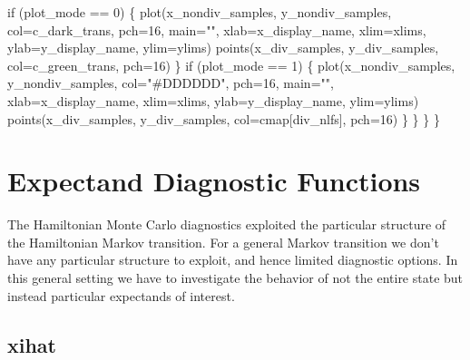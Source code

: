 \documentclass[
  letterpaper,
  DIV=11,
  numbers=noendperiod]{scrartcl}
\newenvironment{Shaded}{\begin{snugshade}}{\end{snugshade}}
\newcommand{\AttributeTok}[1]{\textcolor[rgb]{0.40,0.45,0.13}{#1}}
\newcommand{\ControlFlowTok}[1]{\textcolor[rgb]{0.00,0.23,0.31}{#1}}
\newcommand{\DecValTok}[1]{\textcolor[rgb]{0.68,0.00,0.00}{#1}}
\newcommand{\FunctionTok}[1]{\textcolor[rgb]{0.28,0.35,0.67}{#1}}
\newcommand{\NormalTok}[1]{\textcolor[rgb]{0.00,0.23,0.31}{#1}}
\newcommand{\SpecialCharTok}[1]{\textcolor[rgb]{0.37,0.37,0.37}{#1}}
\newcommand{\StringTok}[1]{\textcolor[rgb]{0.13,0.47,0.30}{#1}}
\begin{document}
\begin{Shaded}
\begin{Highlighting}[]
      \ControlFlowTok{if}\NormalTok{ (plot\_mode }\SpecialCharTok{==} \DecValTok{0}\NormalTok{) \{}
        \FunctionTok{plot}\NormalTok{(x\_nondiv\_samples, y\_nondiv\_samples,}
             \AttributeTok{col=}\NormalTok{c\_dark\_trans, }\AttributeTok{pch=}\DecValTok{16}\NormalTok{, }\AttributeTok{main=}\StringTok{""}\NormalTok{,}
             \AttributeTok{xlab=}\NormalTok{x\_display\_name, }\AttributeTok{xlim=}\NormalTok{xlims, }
             \AttributeTok{ylab=}\NormalTok{y\_display\_name, }\AttributeTok{ylim=}\NormalTok{ylims)}
        \FunctionTok{points}\NormalTok{(x\_div\_samples, y\_div\_samples,}
               \AttributeTok{col=}\NormalTok{c\_green\_trans, }\AttributeTok{pch=}\DecValTok{16}\NormalTok{)}
\NormalTok{      \}}
      \ControlFlowTok{if}\NormalTok{ (plot\_mode }\SpecialCharTok{==} \DecValTok{1}\NormalTok{) \{}
        \FunctionTok{plot}\NormalTok{(x\_nondiv\_samples, y\_nondiv\_samples,}
             \AttributeTok{col=}\StringTok{"\#DDDDDD"}\NormalTok{, }\AttributeTok{pch=}\DecValTok{16}\NormalTok{, }\AttributeTok{main=}\StringTok{""}\NormalTok{,}
             \AttributeTok{xlab=}\NormalTok{x\_display\_name, }\AttributeTok{xlim=}\NormalTok{xlims, }
             \AttributeTok{ylab=}\NormalTok{y\_display\_name, }\AttributeTok{ylim=}\NormalTok{ylims)}
        \FunctionTok{points}\NormalTok{(x\_div\_samples, y\_div\_samples,}
               \AttributeTok{col=}\NormalTok{cmap[div\_nlfs], }\AttributeTok{pch=}\DecValTok{16}\NormalTok{)}
\NormalTok{      \}}
\NormalTok{    \}}
\NormalTok{  \}}
\NormalTok{\}}
\end{Highlighting}
\end{Shaded}

\hypertarget{expectand-diagnostic-functions}{%
\section{Expectand Diagnostic
Functions}\label{expectand-diagnostic-functions}}

The Hamiltonian Monte Carlo diagnostics exploited the particular
structure of the Hamiltonian Markov transition. For a general Markov
transition we don't have any particular structure to exploit, and hence
limited diagnostic options. In this general setting we have to
investigate the behavior of not the entire state but instead particular
expectands of interest.

\hypertarget{xihat}{%
\subsection{xihat}\label{xihat}}
\end{document}

